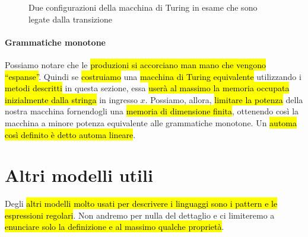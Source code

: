 \documentclass[a4paper,11pt,oneside]{article}
\theoremstyle{plain}
\theoremstyle{definition}
\theoremstyle{remark}
\begin{document}
\begin{figure}[htb]
  \centering
  \caption{Due configurazioni della macchina di Turing in esame che sono legate
  dalla transizione}\label{fig:grammatica-mt-stati}
\end{figure}

\paragraph{Grammatiche monotone} Possiamo notare che le \hl{produzioni si
accorciano man mano che vengono ``espanse''}. Quindi se \hl{costruiamo} una
\hl{macchina di Turing equivalente} utilizzando i \hl{metodi descritti} in
questa sezione, essa \hl{userà al massimo la memoria occupata inizialmente dalla
stringa} in ingresso $x$.  Possiamo, allora, \hl{limitare la potenza} della
nostra macchina fornendogli una \hl{memoria di dimensione finita}, ottenendo
così la macchina a minore potenza equivalente alle grammatiche monotone. Un
\hl{automa così definito è detto automa lineare}.

\section{Altri modelli utili}\label{sec:altri-modelli}

Degli \hl{altri modelli molto usati per descrivere i linguaggi sono i pattern e le
espressioni regolari}. Non andremo per nulla del dettaglio e ci limiteremo a
\hl{enunciare solo la definizione e al massimo qualche proprietà}.
\end{document}
